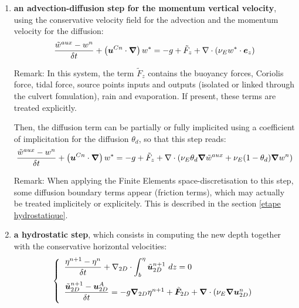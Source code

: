 \begin{enumerate}
\item \textbf{an advection-diffusion step for the momentum vertical velocity}, 
using the conservative velocity field for the advection and the momentum velocity for the diffusion:
\begin{equation}
    \dfrac{\tilde{w}^{aux}-w^n}{\delta t}+
    \left(\bm{u}^{Cn}\cdot\bm{\nabla}\right)w^{*}=
    -g+ \tilde{F}_z+\nabla \cdot(\nu_Ew^*\cdot\bm{e}_z)
\end{equation}
\begin{CommentBlock}{Remark:}
In this system, the term $\tilde{F}_z$ contains the buoyancy forces, 
Coriolis force, tidal force, source points inputs and outputs 
(isolated or linked through the culvert fomulation), rain and evaporation. 
If present, these terms are treated explicitly.
\end{CommentBlock}
Then, the diffusion term can be partially or fully implicited using 
a coefficient of implicitation for the diffusion $\theta_d$, 
so that this step reads:
\begin{equation}
    \dfrac{\tilde{w}^{aux}-w^n}{\delta t}+
    \left(\bm{u}^{Cn}\cdot\bm{\nabla}\right)w^{*}=
    -g+ \tilde{F}_z+\nabla \cdot\left(\nu_E\theta_{d}\bm{\nabla} \tilde{w}^{aux} + \nu_E(1-\theta_{d})\bm{\nabla} w^n\right)
\end{equation}
\begin{CommentBlock}{Remark:}
When applying the Finite Elements space-discretisation to this step,
some diffusion boundary terms appear (friction terms), which may actually be treated
implicitely or explicitely. This is described in the section \ref{etape hydrostatique}.
\end{CommentBlock}

\item \textbf{a hydrostatic step}, which consists in computing the new depth
together with the conservative horizontal velocities:
\begin{equation}\label{eq:hydrostatic_first_system}
  \left\{\begin{array}{l}
    \dfrac{\eta^{n+1}-\eta^{n}}{\delta t} 
    + \nabla_{2D}\cdot \displaystyle{\int_b^\eta\tilde{\vec{u}}_{2D}^{n+1}~dz}=0 \medskip \\
    \dfrac{\tilde{\vec{u}}_{2D}^{n+1}-\vec{u}_{2D}^{A}}{\delta t}=-g\Grad_{2D}\eta^{n+1}
    + \tilde{\vec{F}}_{2D}
    +\BDiv (\nu_E \Grad \vec{u}_{2D}^n)\medskip \\
  \end{array}\right.
\end{equation}


\end{enumerate}
